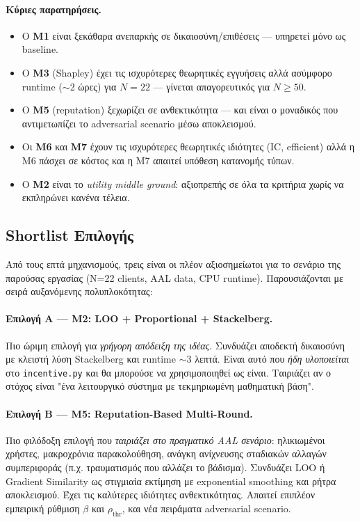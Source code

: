 \paragraph{Κύριες παρατηρήσεις.}

\begin{itemize}
    \item Ο \textbf{M1} είναι ξεκάθαρα ανεπαρκής σε δικαιοσύνη/επιθέσεις — υπηρετεί μόνο ως baseline.
    \item Ο \textbf{M3} (Shapley) έχει τις ισχυρότερες θεωρητικές εγγυήσεις αλλά ασύμφορο runtime
    ($\sim$2 ώρες) για $N=22$ — γίνεται απαγορευτικός για $N \geq 50$.
    \item Ο \textbf{M5} (reputation) ξεχωρίζει σε ανθεκτικότητα — και είναι ο μοναδικός που
    αντιμετωπίζει το adversarial scenario μέσω αποκλεισμού.
    \item Οι \textbf{M6} και \textbf{M7} έχουν τις ισχυρότερες θεωρητικές ιδιότητες (IC, efficient)
    αλλά η M6 πάσχει σε κόστος και η M7 απαιτεί υπόθεση κατανομής τύπων.
    \item Ο \textbf{M2} είναι το \emph{utility middle ground}: αξιοπρεπής σε όλα τα κριτήρια χωρίς
    να εκπληρώνει κανένα τέλεια.
\end{itemize}

\subsection{Shortlist Επιλογής}
\label{subsec:inc_shortlist}

Από τους επτά μηχανισμούς, τρεις είναι οι πλέον αξιοσημείωτοι για το σενάριο της παρούσας εργασίας
(N=22 clients, AAL data, CPU runtime). Παρουσιάζονται με σειρά αυξανόμενης πολυπλοκότητας:

\paragraph{Επιλογή Α — M2: LOO + Proportional + Stackelberg.}
Πιο ώριμη επιλογή για \emph{γρήγορη απόδειξη της ιδέας}. Συνδυάζει αποδεκτή δικαιοσύνη με κλειστή
λύση Stackelberg και runtime $\sim$3 λεπτά. Είναι αυτό που \emph{ήδη υλοποιείται} στο
\texttt{incentive.py} και θα μπορούσε να χρησιμοποιηθεί ως είναι. Ταιριάζει αν ο στόχος είναι "ένα
λειτουργικό σύστημα με τεκμηριωμένη μαθηματική βάση".

\paragraph{Επιλογή Β — M5: Reputation-Based Multi-Round.}
Πιο φιλόδοξη επιλογή που \emph{ταιριάζει στο πραγματικό AAL σενάριο}: ηλικιωμένοι χρήστες, μακροχρόνια
παρακολούθηση, ανάγκη ανίχνευσης σταδιακών αλλαγών συμπεριφοράς (π.χ. τραυματισμός που αλλάζει το
βάδισμα). Συνδυάζει LOO ή Gradient Similarity ως στιγμιαία εκτίμηση με exponential smoothing και
ρήτρα αποκλεισμού. Έχει τις καλύτερες ιδιότητες ανθεκτικότητας. Απαιτεί επιπλέον εμπειρική ρύθμιση
$\beta$ και $\rho_{\text{thr}}$, και νέα πειράματα adversarial scenario.

